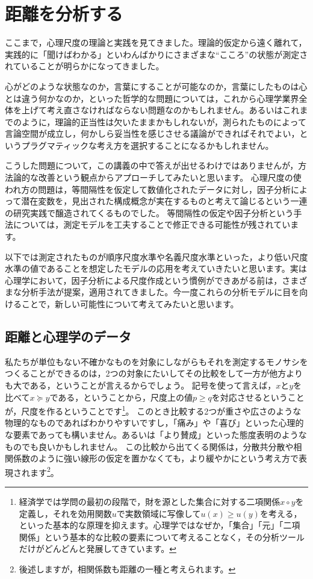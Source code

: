 \documentclass{ltjsbook}
\begin{document}
\chapter{距離を分析する}
\label{H08_Distance}

ここまで，心理尺度の理論と実践を見てきました。理論的仮定から遠く離れて，実践的に「聞けばわかる」といわんばかりにさまざまな``こころ''の状態が測定されていることが明らかになってきました。

心がどのような状態なのか，言葉にすることが可能なのか，言葉にしたものは心とは違う何かなのか，といった哲学的な問題については，これから心理学業界全体を上げて考え直さなければならない問題なのかもしれません。あるいはこれまでのように，理論的正当性は欠いたままかもしれないが，測られたものによって言論空間が成立し，何かしら妥当性を感じさせる議論ができればそれでよい，というプラグマティックな考え方を選択することになるかもしれません。

こうした問題について，この講義の中で答えが出せるわけではありませんが，方法論的な改善という観点からアプローチしてみたいと思います。
心理尺度の使われ方の問題は，等間隔性を仮定して数値化されたデータに対し，因子分析によって潜在変数を，見出された構成概念が実在するものと考えて論じるという一連の研究実践で醸造されてくるものでした。
等間隔性の仮定や因子分析という手法については，測定モデルを工夫することで修正できる可能性が残されています。

以下では測定されたものが順序尺度水準や名義尺度水準といった，より低い尺度水準の値であることを想定したモデルの応用を考えていきたいと思います。実は心理学において，因子分析による尺度作成という慣例ができあがる前は，さまざまな分析手法が提案，適用されてきました。今一度これらの分析モデルに目を向けることで，新しい可能性について考えてみたいと思います。

\section{距離と心理学のデータ}
\label{distance}
私たちが単位もない不確かなものを対象にしながらもそれを測定するモノサシをつくることができるのは，2つの対象にたいしてその比較をして一方が他方よりも大である，ということが言えるからでしょう。
記号を使って言えば，$x$と$y$を比べて$x \succeq y$である，ということから，尺度上の値$p \ge q$を対応させるということが，尺度を作るということです\footnote{経済学では学問の最初の段階で，財を源とした集合に対する二項関係$x \circ y$を定義し，それを効用関数$u$で実数領域に写像して$u(x) \ge u(y)$を考える，といった基本的な原理を抑えます。心理学ではなぜか，「集合」「元」「二項関係」という基本的な比較の要素について考えることなく，その分析ツールだけがどんどんと発展してきています。}。
このとき比較する2つが重さや広さのような物理的なものであればわかりやすいですし，「痛み」や「喜び」といった心理的な要素であっても構いません。あるいは「より賛成」といった態度表明のようなものでも良いかもしれません。
この比較から出てくる関係は，分散共分散や相関係数のように強い線形の仮定を置かなくても，より緩やかにという考え方で表現されます\footnote{後述しますが，相関係数も距離の一種と考えられます。}。
\end{document}
